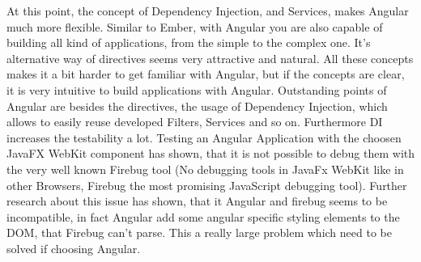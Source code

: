 At this point, the concept of Dependency Injection, and Services, makes Angular much more flexible. Similar to Ember, with Angular you are also capable of building all kind of applications, from the simple to the complex one. It's alternative way of directives seems very attractive and natural. All these concepts makes it a bit harder to get familiar with Angular, but if the concepts are clear, it is very intuitive to build applications with Angular. Outstanding points of Angular are besides the directives, the usage of Dependency Injection, which allows to easily reuse developed Filters, Services and so on. Furthermore DI increases the testability a lot. Testing an Angular Application with the choosen JavaFX WebKit component has shown, that it is not possible to debug them with the very well known Firebug tool (No debugging tools in JavaFx WebKit like in other Browsers, Firebug the most promising JavaScript debugging tool). Further research about this issue has shown, that it Angular and firebug seems to be incompatible, in fact Angular add some angular specific styling elements to the DOM, that Firebug can't parse. This a really large problem which need to be solved if choosing Angular.   

